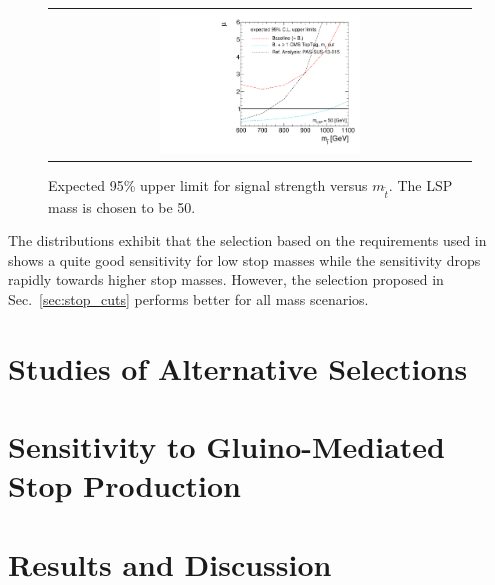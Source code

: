 \begin{figure}[!h]
  \centering
  \begin{tabular}{c}
                \includegraphics[width=0.49\textwidth]{figures/limitplot4BinSel_BaselineTopTagTransverseMassRef.pdf} 
  \end{tabular}
  \caption{Expected 95\% upper limit for signal strength versus $m_{\tilde{t}}$. The LSP mass is chosen to be 50\gev.}
  \label{fig:stop_baselinetoptagref_limit}
\end{figure}

The distributions exhibit that the selection based on the requirements used in~\cite{CMS-PAS-SUS-13-015} shows a quite good sensitivity for low stop masses while the sensitivity drops rapidly towards higher stop masses. However, the selection proposed in Sec.~\ref{sec:stop_cuts} performs better for all mass scenarios.  

\section{Studies of Alternative Selections}
\label{sec:stop_alternatives}

\section{Sensitivity to Gluino-Mediated Stop Production}
\label{sec:stop_gluinos}

\section{Results and Discussion}
\label{sec:stop_results}


